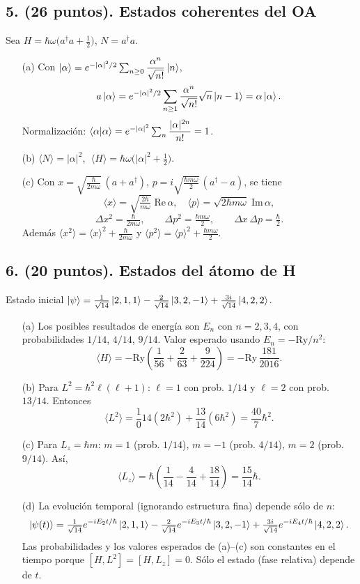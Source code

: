 \documentclass[a4paper,11pt]{article}
\begin{document}
\subsection*{5. (26 puntos). Estados coherentes del OA}
Sea $H=\hbar\omega\big(a^\dagger a+\tfrac{1}{2}\big)$, $N=a^\dagger a$.
\begin{enumerate}
  \item[(a)] Con $\ket{\alpha}=e^{-|\alpha|^2/2}\sum_{n\ge0}\dfrac{\alpha^n}{\sqrt{n!}}\ket{n}$,
  \[
  a\ket{\alpha}=e^{-|\alpha|^2/2}\sum_{n\ge1}\frac{\alpha^n}{\sqrt{n!}}\sqrt{n}\ket{n-1}=\alpha\ket{\alpha}.
  \]
  Normalización: $\braket{\alpha|\alpha}=e^{-|\alpha|^2}\sum_{n}\dfrac{|\alpha|^{2n}}{n!}=1$.
  \item[(b)] $\langle N\rangle=|\alpha|^2$, $\;\langle H\rangle=\hbar\omega\big(|\alpha|^2+\tfrac12\big)$.
  \item[(c)] Con
  $x=\sqrt{\tfrac{\hbar}{2m\omega}}\,(a+a^\dagger)$,
  $p=i\sqrt{\tfrac{\hbar m\omega}{2}}\,(a^\dagger-a)$,
  se tiene
  \[
  \langle x\rangle=\sqrt{\tfrac{2\hbar}{m\omega}}\;\mathrm{Re}\,\alpha,\quad
  \langle p\rangle=\sqrt{2\hbar m\omega}\;\mathrm{Im}\,\alpha,
  \]
  \[
  \Delta x^2=\tfrac{\hbar}{2m\omega},\qquad \Delta p^2=\tfrac{\hbar m\omega}{2},\qquad
  \Delta x\,\Delta p=\tfrac{\hbar}{2}.
  \]
  Además $\langle x^2\rangle=\langle x\rangle^2+\tfrac{\hbar}{2m\omega}$ y $\langle p^2\rangle=\langle p\rangle^2+\tfrac{\hbar m\omega}{2}$.
\end{enumerate}

\subsection*{6. (20 puntos). Estados del átomo de H}
Estado inicial
$\ket{\psi}=\tfrac{1}{\sqrt{14}}\ket{2,1,1}-\tfrac{2}{\sqrt{14}}\ket{3,2,-1}+\tfrac{3i}{\sqrt{14}}\ket{4,2,2}$.
\begin{enumerate}
  \item[(a)] Los posibles resultados de energía son $E_n$ con $n=2,3,4$, con probabilidades $1/14$, $4/14$, $9/14$. Valor esperado usando $E_n=-\mathrm{Ry}/n^2$:
  \[
  \langle H\rangle=-\mathrm{Ry}\left(\frac{1}{56}+\frac{2}{63}+\frac{9}{224}\right)=-\mathrm{Ry}\,\frac{181}{2016}.
  \]
  \item[(b)] Para $L^2=\hbar^2\ell(\ell+1)$: $\ell=1$ con prob. $1/14$ y $\ell=2$ con prob. $13/14$. Entonces
  \[
  \langle L^2\rangle=\frac{1}0{14}(2\hbar^2)+\frac{13}{14}(6\hbar^2)=\frac{40}{7}\hbar^2.
  \]
  \item[(c)] Para $L_z=\hbar m$: $m=1$ (prob. $1/14$), $m=-1$ (prob. $4/14$), $m=2$ (prob. $9/14$). Así,
  \[
  \langle L_z\rangle=\hbar\left(\frac{1}{14}-\frac{4}{14}+\frac{18}{14}\right)=\frac{15}{14}\hbar.
  \]
  \item[(d)] La evolución temporal (ignorando estructura fina) depende sólo de $n$:
  \[
  \ket{\psi(t)}=\tfrac{1}{\sqrt{14}}e^{-iE_2 t/\hbar}\ket{2,1,1}-\tfrac{2}{\sqrt{14}}e^{-iE_3 t/\hbar}\ket{3,2,-1}+\tfrac{3i}{\sqrt{14}}e^{-iE_4 t/\hbar}\ket{4,2,2}.
  \]
  Las probabilidades y los valores esperados de (a)--(c) son constantes en el tiempo porque $[H,L^2]=[H,L_z]=0$. Sólo el estado (fase relativa) depende de $t$.
\end{enumerate}
\end{document}
